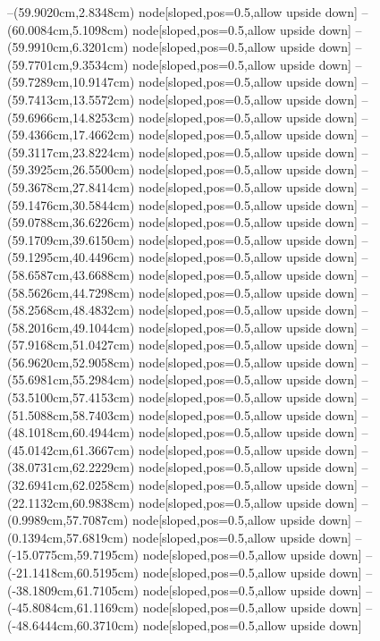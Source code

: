 --(59.9020cm,2.8348cm) node[sloped,pos=0.5,allow upside down]{\ArrowIn}
--(60.0084cm,5.1098cm) node[sloped,pos=0.5,allow upside down]{\ArrowIn}
--(59.9910cm,6.3201cm) node[sloped,pos=0.5,allow upside down]{\ArrowIn}
--(59.7701cm,9.3534cm) node[sloped,pos=0.5,allow upside down]{\ArrowIn}
--(59.7289cm,10.9147cm) node[sloped,pos=0.5,allow upside down]{\ArrowIn}
--(59.7413cm,13.5572cm) node[sloped,pos=0.5,allow upside down]{\ArrowIn}
--(59.6966cm,14.8253cm) node[sloped,pos=0.5,allow upside down]{\ArrowIn}
--(59.4366cm,17.4662cm) node[sloped,pos=0.5,allow upside down]{\ArrowIn}
--(59.3117cm,23.8224cm) node[sloped,pos=0.5,allow upside down]{\ArrowIn}
--(59.3925cm,26.5500cm) node[sloped,pos=0.5,allow upside down]{\ArrowIn}
--(59.3678cm,27.8414cm) node[sloped,pos=0.5,allow upside down]{\ArrowIn}
--(59.1476cm,30.5844cm) node[sloped,pos=0.5,allow upside down]{\ArrowIn}
--(59.0788cm,36.6226cm) node[sloped,pos=0.5,allow upside down]{\ArrowIn}
--(59.1709cm,39.6150cm) node[sloped,pos=0.5,allow upside down]{\ArrowIn}
--(59.1295cm,40.4496cm) node[sloped,pos=0.5,allow upside down]{\arrowIn}
--(58.6587cm,43.6688cm) node[sloped,pos=0.5,allow upside down]{\ArrowIn}
--(58.5626cm,44.7298cm) node[sloped,pos=0.5,allow upside down]{\ArrowIn}
--(58.2568cm,48.4832cm) node[sloped,pos=0.5,allow upside down]{\ArrowIn}
--(58.2016cm,49.1044cm) node[sloped,pos=0.5,allow upside down]{\arrowIn}
--(57.9168cm,51.0427cm) node[sloped,pos=0.5,allow upside down]{\ArrowIn}
--(56.9620cm,52.9058cm) node[sloped,pos=0.5,allow upside down]{\ArrowIn}
--(55.6981cm,55.2984cm) node[sloped,pos=0.5,allow upside down]{\ArrowIn}
--(53.5100cm,57.4153cm) node[sloped,pos=0.5,allow upside down]{\ArrowIn}
--(51.5088cm,58.7403cm) node[sloped,pos=0.5,allow upside down]{\ArrowIn}
--(48.1018cm,60.4944cm) node[sloped,pos=0.5,allow upside down]{\ArrowIn}
--(45.0142cm,61.3667cm) node[sloped,pos=0.5,allow upside down]{\ArrowIn}
--(38.0731cm,62.2229cm) node[sloped,pos=0.5,allow upside down]{\ArrowIn}
--(32.6941cm,62.0258cm) node[sloped,pos=0.5,allow upside down]{\ArrowIn}
--(22.1132cm,60.9838cm) node[sloped,pos=0.5,allow upside down]{\ArrowIn}
--(0.9989cm,57.7087cm) node[sloped,pos=0.5,allow upside down]{\ArrowIn}
--(0.1394cm,57.6819cm) node[sloped,pos=0.5,allow upside down]{\arrowIn}
--(-15.0775cm,59.7195cm) node[sloped,pos=0.5,allow upside down]{\ArrowIn}
--(-21.1418cm,60.5195cm) node[sloped,pos=0.5,allow upside down]{\ArrowIn}
--(-38.1809cm,61.7105cm) node[sloped,pos=0.5,allow upside down]{\ArrowIn}
--(-45.8084cm,61.1169cm) node[sloped,pos=0.5,allow upside down]{\ArrowIn}
--(-48.6444cm,60.3710cm) node[sloped,pos=0.5,allow upside down]{\ArrowIn}
